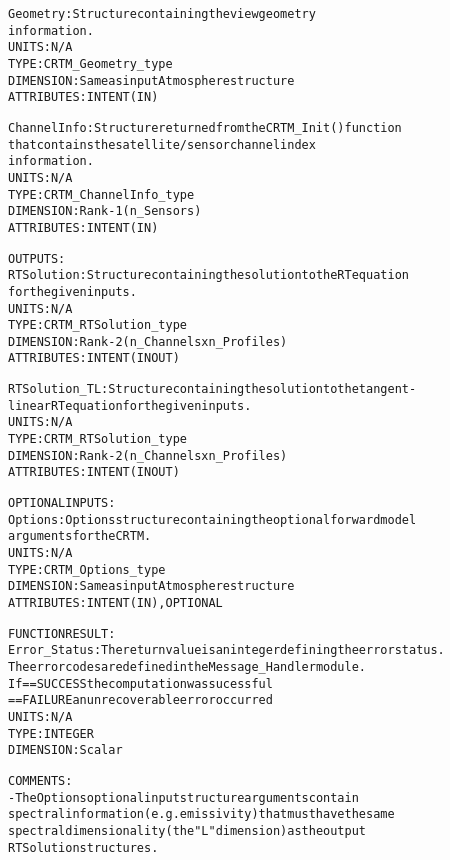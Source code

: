 \begin{alltt}
        Geometry:       Structure containing the view geometry
                        information.
                        UNITS:      N/A
                        TYPE:       CRTM_Geometry_type
                        DIMENSION:  Same as input Atmosphere structure
                        ATTRIBUTES: INTENT(IN)
 
        ChannelInfo:    Structure returned from the CRTM_Init() function
                        that contains the satellite/sensor channel index
                        information.
                        UNITS:      N/A
                        TYPE:       CRTM_ChannelInfo_type
                        DIMENSION:  Rank-1 (n_Sensors)
                        ATTRIBUTES: INTENT(IN)
 
  OUTPUTS:
        RTSolution:     Structure containing the solution to the RT equation
                        for the given inputs.
                        UNITS:      N/A
                        TYPE:       CRTM_RTSolution_type
                        DIMENSION:  Rank-2 (n_Channels x n_Profiles)
                        ATTRIBUTES: INTENT(IN OUT)
 
        RTSolution_TL:  Structure containing the solution to the tangent-
                        linear RT equation for the given inputs.
                        UNITS:      N/A
                        TYPE:       CRTM_RTSolution_type
                        DIMENSION:  Rank-2 (n_Channels x n_Profiles)
                        ATTRIBUTES: INTENT(IN OUT)
 
  OPTIONAL INPUTS:
        Options:        Options structure containing the optional forward model
                        arguments for the CRTM.
                        UNITS:      N/A
                        TYPE:       CRTM_Options_type
                        DIMENSION:  Same as input Atmosphere structure
                        ATTRIBUTES: INTENT(IN), OPTIONAL
 
  FUNCTION RESULT:
        Error_Status:   The return value is an integer defining the error status.
                        The error codes are defined in the Message_Handler module.
                        If == SUCCESS the computation was sucessful
                           == FAILURE an unrecoverable error occurred
                        UNITS:      N/A
                        TYPE:       INTEGER
                        DIMENSION:  Scalar
 
  COMMENTS:
        - The Options optional input structure arguments contain
          spectral information (e.g. emissivity) that must have the same
          spectral dimensionality (the "L" dimension) as the output
          RTSolution structures.
 
  \end{alltt}
